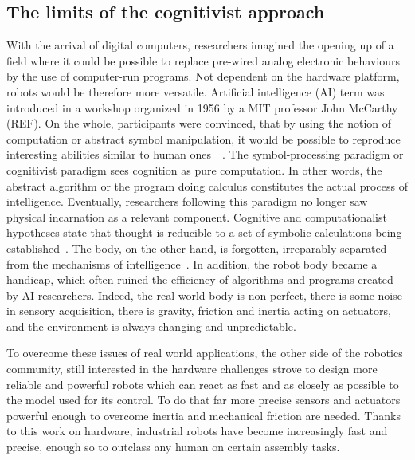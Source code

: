 \subsection{The limits of the cognitivist approach} %


With the arrival of digital computers, researchers imagined the opening up of a field where it could be possible to replace pre-wired analog electronic behaviours by the use of computer-run programs. Not dependent on the hardware platform, robots would be therefore more versatile.
Artificial intelligence (AI) term was introduced in a workshop organized in 1956 by a MIT professor John McCarthy (REF). On the whole, participants were convinced, that by using the notion of computation or abstract symbol manipulation, it would be possible to reproduce interesting abilities similar to human ones~\parencite{kaufmann1979machines}~\parencite{haugeland1989artificial}. The symbol-processing paradigm or cognitivist paradigm sees cognition as pure computation. In other words, the abstract algorithm or the program doing calculus constitutes the actual process of intelligence. Eventually, researchers following this paradigm no longer saw physical incarnation as a relevant component. Cognitive and computationalist hypotheses state that thought is reducible to a set of symbolic calculations being established~\parencite{fodor1987psychosemantics}. The body, on the other hand, is forgotten, irreparably separated from the mechanisms of intelligence~\parencite{kaplan2008corps}.
In addition, the robot body became a handicap, which often ruined the efficiency of algorithms and programs created by AI researchers. Indeed, the real world body is non-perfect, there is some noise in sensory acquisition, there is gravity, friction and inertia acting on actuators, and the environment is always changing and unpredictable.

To overcome these issues of real world applications, the other side of the robotics community, still interested in the hardware challenges strove to design more reliable and powerful robots which can react as fast and as closely as possible to the model used for its control. To do that far more precise sensors and actuators powerful enough to overcome inertia and mechanical friction are needed. Thanks to this work on hardware, industrial robots have become increasingly fast and precise, enough so to outclass any human on certain assembly tasks.


